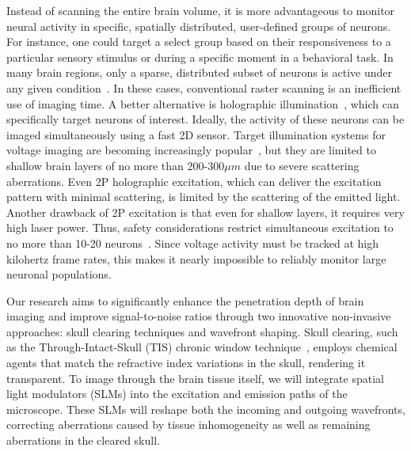 Instead of scanning the entire brain volume, it is more advantageous to monitor neural activity in specific, spatially distributed, user-defined groups of neurons. For instance, one could target a select group based on their responsiveness to a particular sensory stimulus or during a specific moment in a behavioral task. In many brain regions, only a sparse, distributed subset of neurons is active under any given condition~\cite{poo2009odor,diamantaki2016sparse,hromadka2008sparse,crochet2011synaptic,peron2015cellular,tang2018large}. In these cases, conventional raster scanning is an inefficient use of imaging time. A better alternative is holographic illumination~\cite{Yang2018Holographic,mardinly2018precise,pegard2017three,hernandez2016three,nikolenko2008slm,dal2010simultaneous,ronzitti2017recent,vaziri2012reshaping,yang2016simultaneous,dana2014hybrid,dana2012remotely}, which can specifically target neurons of interest. Ideally, the activity of these neurons can be imaged simultaneously using a fast 2D sensor. Target illumination systems for voltage imaging are becoming increasingly popular~\cite{Sims2024Scanless,Xiao2024LargeScale}, but they are limited to shallow brain layers of no more than 200-300$\mu m$  due to severe scattering aberrations. Even 2P holographic excitation, which can deliver the excitation pattern with minimal scattering, is limited by the scattering of the emitted light. Another drawback of 2P excitation is that even for shallow layers, it requires very high laser power. Thus, safety considerations restrict simultaneous excitation to no more than 10-20 neurons~\cite{Davis2024Optical}. Since voltage activity must be tracked at high kilohertz frame rates, this makes it nearly impossible to reliably monitor large neuronal populations.



Our research aims to significantly enhance the penetration depth of brain imaging and improve signal-to-noise ratios through two innovative non-invasive approaches: skull clearing techniques and wavefront shaping. Skull clearing, such as the Through-Intact-Skull (TIS) chronic window technique~\cite{Li2022TIS}, employs chemical agents that match the refractive index variations in the skull, rendering it transparent. To image through the brain tissue itself, we will integrate spatial light modulators (SLMs) into the excitation and emission paths of the microscope. These SLMs will reshape both the incoming and outgoing wavefronts, correcting aberrations caused by tissue inhomogeneity as well as remaining aberrations in the cleared skull.

